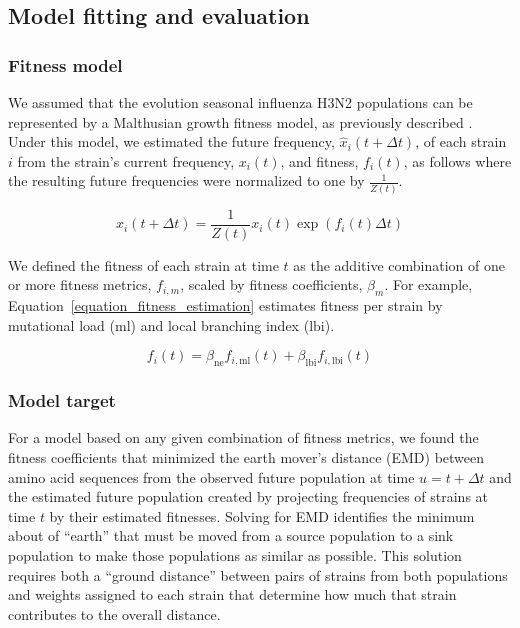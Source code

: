 \subsection*{Model fitting and evaluation}

\subsubsection*{Fitness model}

We assumed that the evolution seasonal influenza H3N2 populations can be represented by a Malthusian growth fitness model, as previously described \cite{Luksza:2014hj}.
Under this model, we estimated the future frequency, $\hat{x}_{i}(t + \Delta{t})$, of each strain $i$ from the strain's current frequency, $x_{i}(t)$, and fitness, $f_{i}(t)$, as follows where the resulting future frequencies were normalized to one by $\frac{1}{Z(t)}$.

\begin{equation}
    \hat{x}_{i}(t + \Delta{t}) = \frac{1}{Z(t)}x_{i}(t)\exp(f_{i}(t)\Delta{t})
    \label{equation_exponential_growth_model}
\end{equation}

We defined the fitness of each strain at time $t$ as the additive combination of one or more fitness metrics, $f_{i,m}$, scaled by fitness coefficients, $\beta_{m}$.
For example, Equation~\ref{equation_fitness_estimation} estimates fitness per strain by mutational load ($\mathrm{ml}$) and local branching index ($\mathrm{lbi}$).

\begin{equation}
    f_{i}(t) = \beta_{\mathrm{ne}}f_{i, \mathrm{ml}}(t) + \beta_{\mathrm{lbi}}f_{i, \mathrm{lbi}}(t)
    \label{equation_fitness_estimation}
\end{equation}

\subsubsection*{Model target}

For a model based on any given combination of fitness metrics, we found the fitness coefficients that minimized the earth mover's distance (EMD) \cite{Rubner1998,Kusner2015} between amino acid sequences from the observed future population at time $u = t + \Delta{t}$ and the estimated future population created by projecting frequencies of strains at time $t$ by their estimated fitnesses.
Solving for EMD identifies the minimum about of ``earth'' that must be moved from a source population to a sink population to make those populations as similar as possible.
This solution requires both a ``ground distance'' between pairs of strains from both populations and weights assigned to each strain that determine how much that strain contributes to the overall distance.

